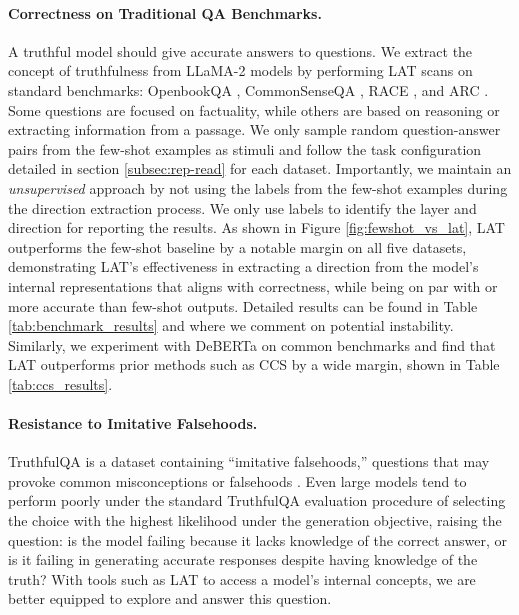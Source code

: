 \paragraph{Correctness on Traditional QA Benchmarks.}
A truthful model should give accurate answers to questions. We extract the concept of truthfulness from LLaMA-2 models by performing LAT scans on standard benchmarks: OpenbookQA \citep{obqa}, CommonSenseQA \citep{talmor-etal-2019-commonsenseqa}, RACE \citep{lai-etal-2017-race}, and ARC \citep{arc}. Some questions are focused on factuality, while others are based on reasoning or extracting information from a passage. We only sample random question-answer pairs from the few-shot examples as stimuli and follow the task configuration detailed in section \ref{subsec:rep-read} for each dataset. Importantly, we maintain an \textit{unsupervised} approach by not using the labels from the few-shot examples during the direction extraction process. We only use labels to identify the layer and direction for reporting the results. As shown in Figure \ref{fig:fewshot_vs_lat}, LAT outperforms the few-shot baseline by a notable margin on all five datasets, demonstrating LAT's effectiveness in extracting a direction from the model's internal representations that aligns with correctness, while being on par with or more accurate than few-shot outputs. Detailed results can be found in Table \ref{tab:benchmark_results} and  where we comment on potential instability. Similarly, we experiment with DeBERTa on common benchmarks and find that LAT outperforms prior methods such as CCS \citep{burns2022discovering} by a wide margin, shown in Table \ref{tab:ccs_results}.



\paragraph{Resistance to Imitative Falsehoods.}\label{sec:tqa}
TruthfulQA is a dataset containing ``imitative falsehoods,'' questions that may provoke common misconceptions or falsehoods \citep{truthfulqa}. Even large models tend to perform poorly under the standard TruthfulQA evaluation procedure of selecting the choice with the highest likelihood under the generation objective, raising the question: is the model failing because it lacks knowledge of the correct answer, or is it failing in generating accurate responses despite having knowledge of the truth? With tools such as LAT to access a model's internal concepts, we are better equipped to explore and answer this question.

